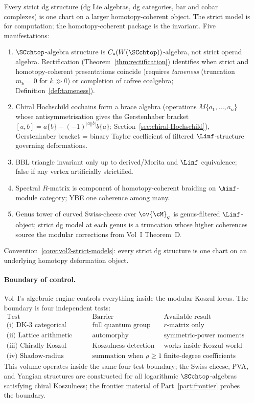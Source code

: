 Every strict dg structure (dg Lie algebras, dg categories, bar
and cobar complexes) is one chart on a larger
homotopy-coherent object. The strict model is for computation;
the homotopy-coherent package is the invariant. Five
manifestations:
\begin{enumerate}[label=\textup{(\roman*)}]
\item $\SCchtop$-algebra structure is $C_\ast(W(\SCchtop))$-algebra,
 not strict operad algebra. Rectification
 (Theorem~\ref{thm:rectification}) identifies when strict and
 homotopy-coherent presentations coincide (requires
 \emph{tameness} (truncation $m_k=0$ for $k\gg0$) or completion
 of cofree coalgebra; Definition~\ref{def:tameness}).
\item Chiral Hochschild cochains form a brace algebra (operations
 $M\{a_1,\ldots,a_n\}$ whose antisymmetrisation gives the
 Gerstenhaber bracket
 $[a,b] = a\{b\} - (-1)^{|a||b|} b\{a\}$;
 Section~\ref{sec:chiral-Hochschild}), Gerstenhaber bracket =
 binary Taylor coefficient of filtered $\Linf$-structure
 governing deformations.
\item BBL triangle invariant only up to derived/Morita and
 $\Linf$ equivalence; false if any vertex artificially
 strictified.
\item Spectral $R$-matrix is component of homotopy-coherent
 braiding on $\Ainf$-module category; YBE one coherence among
 many.
\item Genus tower of curved Swiss-cheese over $\ov{\cM}_g$ is
 genus-filtered $\Linf$-object; strict dg model at each genus is
 a truncation whose higher coherences source the modular
 corrections from Vol~I Theorem~D.
\end{enumerate}

\noindent
Convention~\ref{conv:vol2-strict-models}: every strict dg
structure is one chart on an underlying homotopy deformation
object.

\paragraph{Boundary of control.}
Vol~I's algebraic engine controls everything inside the modular
Koszul locus. The boundary is four independent tests:
\[
\renewcommand{\arraystretch}{1.3}
\begin{array}{l|l|l}
\text{Test} & \text{Barrier} & \text{Available result} \\
\hline
\text{(i) DK-3 categorical} &
 \text{full quantum group} &
 r\text{-matrix only} \\
\text{(ii) Lattice arithmetic} &
 \text{automorphy} &
 \text{symmetric-power moments only} \\
\text{(iii) Chirally Koszul geometric} &
 \text{Koszulness detection} &
 \text{works inside Koszul world only} \\
\text{(iv) Shadow-radius analytic} &
 \text{summation when } \rho \ge 1 &
 \text{finite-degree coefficients only}
\end{array}
\]
This volume operates inside the same four-test boundary; the
Swiss-cheese, PVA, and Yangian structures are constructed for
all logarithmic $\SCchtop$-algebras satisfying chiral
Koszulness; the frontier material of Part~\ref{part:frontier}
probes the boundary.


